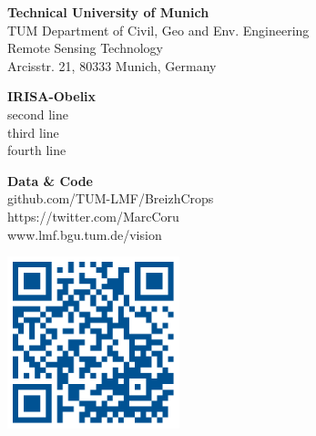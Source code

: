 \documentclass[a0]{tumposter}
\begin{document}
\begin{footer}
	\begin{minipage}{.33\textwidth}
		\textbf{Technical University of Munich}\footnotemark[1]\\
		TUM Department of Civil, Geo and Env. Engineering \\
		Remote Sensing Technology \\
		Arcisstr. 21, 80333 Munich, Germany
	\end{minipage}
	\begin{minipage}{.33\textwidth}
		\textbf{IRISA-Obelix}\footnotemark[2]\\
		second line \\
		third line \\
		fourth line
	\end{minipage}
	\begin{minipage}{.23\textwidth}
		\textbf{Data \& Code} \\
		{github.com/TUM-LMF/BreizhCrops} \\
		{https://twitter.com/MarcCoru} \\
		www.lmf.bgu.tum.de/vision
	\end{minipage}
	\begin{minipage}{.10\textwidth}
		\hfill\includegraphics[width=5cm]{images/qrcode}\\
		
	\end{minipage}

	
\end{footer}
\end{document}
